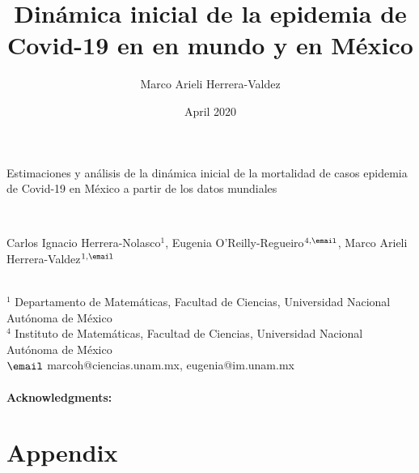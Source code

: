 \documentclass[8pt]{article}
\title{Dinámica inicial de la epidemia de Covid-19 en en mundo y en México }
\author{Marco Arieli Herrera-Valdez}
\date{April 2020}
\begin{document}
%
\begin{flushleft}
\begin{Large}
{Estimaciones y análisis de la dinámica inicial de la mortalidad de casos epidemia de Covid-19 en México a partir de los datos mundiales}
\end{Large}\\
\smallskip
\begin{large}
Carlos Ignacio Herrera-Nolasco$^1$, Eugenia O'Reilly-Regueiro$^{4,\email}$,
Marco Arieli Herrera-Valdez$^{1,\email}$
\end{large}\\
\smallskip
$^1$ Departamento de Matemáticas, Facultad de Ciencias, Universidad Nacional Autónoma de México\\
$^4$ Instituto de Matemáticas, Facultad de Ciencias, Universidad Nacional Autónoma de México\\
$\email$ marcoh@ciencias.unam.mx, eugenia@im.unam.mx
\end{flushleft}





\paragraph{Acknowledgments:} 

\newpage
\section{Appendix}
\end{document}
